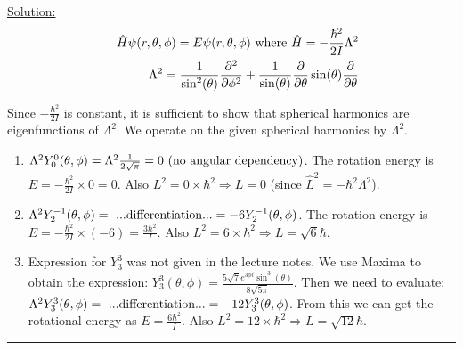 \noindent
\underline{Solution:}\\
\begin{eqnarray}
\nonumber
& & \hat{H}\psi(r,\theta,\phi) = E\psi(r,\theta,\phi)\textnormal{ where }\hat{H}=-\frac{\hbar^2}{2I}\Lambda^2\\
\nonumber
& & \Lambda^2 = \frac{1}{\sin^2(\theta)}\frac{\partial^2}{\partial\phi^2} + \frac{1}{\sin(\theta)}\frac{\partial}{\partial\theta}\sin(\theta)\frac{\partial}{\partial\theta}
\end{eqnarray}

Since $-\frac{\hbar^2}{2I}$ is constant, it is sufficient to show that spherical harmonics are eigenfunctions of $\Lambda^2$. We operate on the given spherical harmonics by $\Lambda^2$.
\begin{enumerate}
\item $\Lambda^2Y_0^0(\theta,\phi) = \Lambda^2\frac{1}{2\sqrt{\pi}} = 0\textnormal{ (no angular dependency)}$. The rotation energy is $E = -\frac{\hbar^2}{2I}\times 0 = 0$. Also $L^2 = 0\times\hbar^2 \Rightarrow L = 0$ (since $\hat{L}^2 = -\hbar^2\Lambda^2$).
\item $\Lambda^2Y_2^{-1}(\theta,\phi) = \textnormal{ ...differentiation...} = -6Y_2^{-1}(\theta,\phi)$. The rotation energy is $E = -\frac{\hbar^2}{2I}\times (-6) = \frac{3\hbar^2}{I}$. Also $L^2 = 6\times\hbar^2 \Rightarrow L = \sqrt{6}\hbar$.
\item Expression for $Y_3^3$ was not given in the lecture notes. We use Maxima to obtain the expression: $Y_3^3(\theta,\phi) = \frac{5\sqrt{7}e^{3\phi i}\sin^3(\theta)}{8\sqrt{5\pi}}$. Then we need to evaluate: $\Lambda^2Y_3^3(\theta,\phi) = \textnormal{ ...differentiation...} = -12Y_3^3(\theta,\phi)$.
From this we can get the rotational energy as $E = \frac{6\hbar^2}{I}$. Also $L^2 = 12\times\hbar^2 \Rightarrow L = \sqrt{12}\hbar$.
\end{enumerate}

\hrule\vspace{0.5cm}
